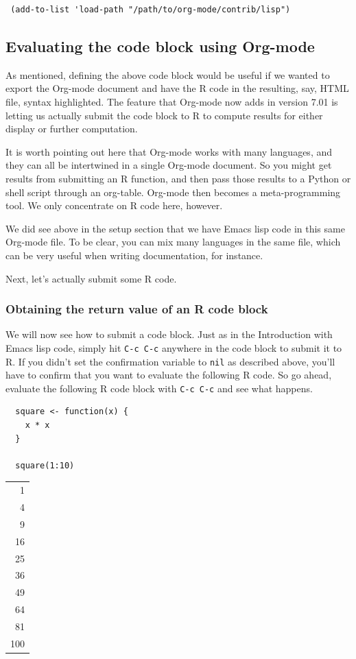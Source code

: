 \documentclass[11pt]{article}
\begin{document}
\begin{verbatim}
 (add-to-list 'load-path "/path/to/org-mode/contrib/lisp")
\end{verbatim}
\subsection*{Evaluating the code block using Org-mode}
\label{sec-3-2}

As mentioned, defining the above code block would be useful if we
wanted to export the Org-mode document and have the R code in the
resulting, say, HTML file, syntax highlighted. The feature that
Org-mode now adds in version 7.01 is letting us actually submit the
code block to R to compute results for either display or further
computation.

It is worth pointing out here that Org-mode works with many languages,
and they can all be intertwined in a single Org-mode document. So you
might get results from submitting an R function, and then pass those
results to a Python or shell script through an org-table. Org-mode
then becomes a meta-programming tool. We only concentrate on R code
here, however.

We did see above in the setup section that we have Emacs lisp code in
this same Org-mode file. To be clear, you can mix many languages in
the same file, which can be very useful when writing documentation,
for instance.

Next, let's actually submit some R code.

\subsubsection*{Obtaining the return value of an R code block}
\label{sec-3-2-1}

We will now see how to submit a code block. Just as in the
Introduction with Emacs lisp code, simply hit \texttt{C-c C-c} anywhere in
the code block to submit it to R. If you didn't set the confirmation
variable to \texttt{nil} as described above, you'll have to confirm that you
want to evaluate the following R code. So go ahead, evaluate the
following R code block with \texttt{C-c C-c} and see what happens.

\begin{verbatim}
  square <- function(x) {
    x * x
  }
  
  square(1:10)
\end{verbatim}

\begin{center}
\begin{tabular}{r}
1\\
4\\
9\\
16\\
25\\
36\\
49\\
64\\
81\\
100\\
\end{tabular}
\end{center}
\end{document}
